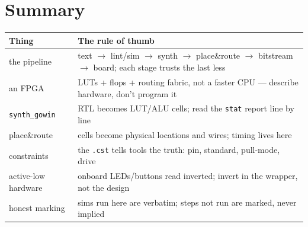 \section{Summary}\label{sec:sum13}

\begin{center}
\begin{tabularx}{\linewidth}{@{}lX@{}}
\toprule
\textbf{Thing} & \textbf{The rule of thumb}\\
\midrule
the pipeline & text $\to$ lint/sim $\to$ synth $\to$ place\&route $\to$
bitstream $\to$ board; each stage trusts the last less\\
an FPGA & LUTs + flops + routing fabric, not a faster CPU --- describe
hardware, don't program it\\
\texttt{synth\_gowin} & RTL becomes LUT/ALU cells; read the \texttt{stat}
report line by line\\
place\&route & cells become physical locations and wires; timing lives
here\\
constraints & the \texttt{.cst} tells tools the truth: pin, standard,
pull-mode, drive\\
active-low hardware & onboard LEDs/buttons read inverted; invert in the
wrapper, not the design\\
honest marking & sims run here are verbatim; steps not run are marked,
never implied\\
\bottomrule
\end{tabularx}
\end{center}

